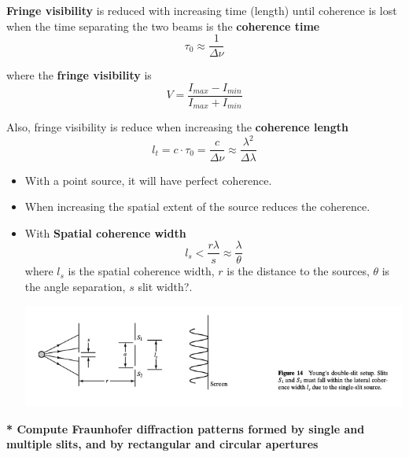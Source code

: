 \documentclass[10pt]{article}
\newcommand*{\lo}[1]{
    \textbf{* #1} \newline
}
\begin{document}
\textbf{Fringe visibility} is reduced with increasing time (length) until coherence is lost when the time separating the two beams is the \textbf{coherence time}
\[\tau_0 \approx \frac{1}{\Delta \nu}\]

where the \textbf{fringe visibility} is
\[V = \frac{I_{max} - I_{min}}{I_{max} + I_{min}}\]

Also, fringe visibility is reduce when increasing the \textbf{coherence length}
\[l_t = c \cdot \tau_0 = \frac{c}{\Delta \nu} \approx \frac{\lambda^2}{\Delta\lambda}\]

\begin{itemize}
    \item With a point source, it will have perfect coherence.
    \item When increasing the spatial extent of the source reduces the coherence.
    \item With \textbf{Spatial coherence width}
    \[l_s < \frac{r\lambda}{s} \approx \frac{\lambda}{\theta}\]
    where $l_s$ is the spatial coherence width, $r$ is the distance to the sources, $\theta$ is the angle separation, $s$ slit width?.
    \begin{center}
        \includegraphics*[scale = .5]{imgs/spatial-coherence-width-1.png}
    \end{center}
\end{itemize}

\newpage

\lo{Compute Fraunhofer diffraction patterns formed by single and multiple slits, and by rectangular and circular apertures}
\end{document}
